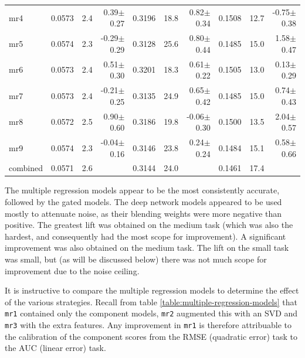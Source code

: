 \documentclass{article}
\begin{document}
\begin{table}[t]
\begin{center}
\begin{small}
\begin{sc}
\begin{tabular}{l|rr r|rr r|rr r}
mr4        & 0.0573 &   2.4 &  0.39$\pm$0.27& 0.3196 &  18.8 &  0.82$\pm$0.34& 0.1508 &  12.7 & -0.75$\pm$0.38 \\ 
mr5        & 0.0574 &   2.3 & -0.29$\pm$0.29& 0.3128 &  25.6 &  0.80$\pm$0.44& 0.1485 &  15.0 &  1.58$\pm$0.47 \\ 
mr6        & 0.0573 &   2.4 &  0.51$\pm$0.30& 0.3201 &  18.3 &  0.61$\pm$0.22& 0.1505 &  13.0 &  0.13$\pm$0.29 \\ 
mr7        & 0.0573 &   2.4 & -0.21$\pm$0.25& 0.3135 &  24.9 &  0.65$\pm$0.42& 0.1485 &  15.0 &  0.74$\pm$0.43 \\ 
mr8        & 0.0572 &   2.5 &  0.90$\pm$0.60& 0.3186 &  19.8 & -0.06$\pm$0.30& 0.1500 &  13.5 &  2.04$\pm$0.57 \\ 
mr9        & 0.0574 &   2.3 & -0.04$\pm$0.16& 0.3146 &  23.8 &  0.24$\pm$0.24& 0.1484 &  15.1 &  0.58$\pm$0.66 \\ 
\abovespace\belowspace
combined   & 0.0571 &   2.6 &  & 0.3144 &  24.0 &  & 0.1461 &  17.4 &   \\ 
\hline
\end{tabular}
\end{sc}
\end{small}
\end{center}
\vskip -0.1in
\end{table}

The multiple regression models appear to be the most consistently accurate, followed by the gated models.  The deep network models appeared to be used mostly to attenuate noise, as their blending weights were more negative than positive.  The greatest lift was obtained on the medium task (which was also the hardest, and consequently had the most scope for improvement).  A significant improvement was also obtained on the medium task.  The lift on the small task was small, but (as will be discussed below) there was not much scope for improvement due to the noise ceiling.

It is instructive to compare the multiple regression models to determine the effect of the various strategies.  Recall from table \ref{table:multiple-regression-models} that \texttt{mr1} contained only the component models, \texttt{mr2} augmented this with an SVD and \texttt{mr3} with the extra features.  Any improvement in \texttt{mr1} is therefore attribuable to the calibration of the component scores from the RMSE (quadratic error) task to the AUC (linear error) task.
\end{document}
